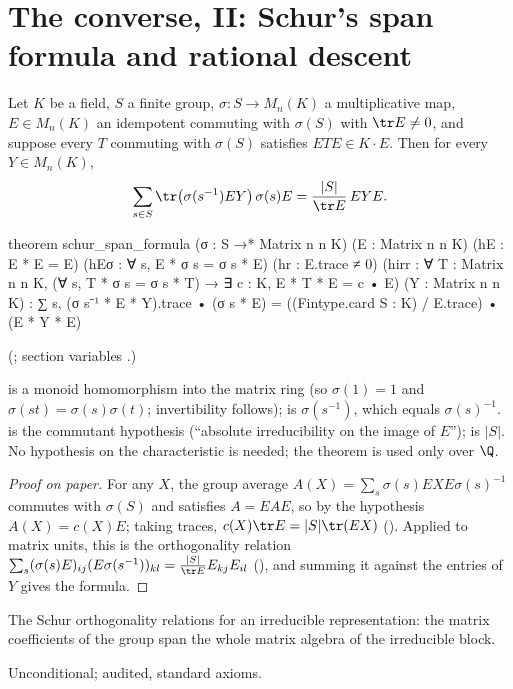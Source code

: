 \section{The converse, II: Schur's span formula and rational descent}\label{ch22:sec:schur}

\begin{theorem}\label{ch22:thm:schurspan}
Let $K$ be a field, $S$ a finite group, $\sigma:S\to M_n(K)$ a multiplicative map, $E\in M_n(K)$ an idempotent commuting with
$\sigma(S)$ with $\tr E\ne0$, and suppose every $T$ commuting with $\sigma(S)$ satisfies $ETE\in K\cdot E$.  Then for every
$Y\in M_n(K)$,
\begin{equation*}
  \sum_{s\in S}\tr\bigl(\sigma(s^{-1})EY\bigr)\,\sigma(s)E=\frac{|S|}{\tr E}\,EYE .
\end{equation*}
\end{theorem}
\begin{leancode}
theorem schur_span_formula (σ : S →* Matrix n n K) (E : Matrix n n K) (hE : E * E = E)
    (hEσ : ∀ s, E * σ s = σ s * E) (hr : E.trace ≠ 0)
    (hirr : ∀ T : Matrix n n K, (∀ s, T * σ s = σ s * T) → ∃ c : K, E * T * E = c • E)
    (Y : Matrix n n K) :
    ∑ s, (σ s⁻¹ * E * Y).trace • (σ s * E)
      = ((Fintype.card S : K) / E.trace) • (E * Y * E)
\end{leancode}
(; section variables
.)
\begin{dictionary}
 is a monoid homomorphism into the matrix ring (so $\sigma(1)=1$ and $\sigma(st)=\sigma(s)\sigma(t)$;
invertibility follows);  is $\sigma(s^{-1})$, which equals $\sigma(s)^{-1}$.   is the commutant
hypothesis (``absolute irreducibility on the image of $E$'');  is $|S|$.  No hypothesis on the characteristic is needed; the theorem is used only over $\Q$.
\end{dictionary}
\begin{proof}[Proof on paper]
For any $X$, the group average $A(X)=\sum_s\sigma(s)EXE\sigma(s)^{-1}$ commutes with $\sigma(S)$ and satisfies $A=EAE$, so
by the hypothesis $A(X)=c(X)E$; taking traces, $c(X)\tr E=|S|\tr(EX)$ ().  Applied to matrix
units, this is the orthogonality relation $\sum_s(\sigma(s)E)_{ij}(E\sigma(s^{-1}))_{kl}=\frac{|S|}{\tr E}E_{kj}E_{il}$
(), and summing it against the entries of $Y$ gives the formula.
\end{proof}
\begin{physics}The Schur orthogonality relations for an irreducible representation: the matrix coefficients of the group
span the whole matrix algebra of the irreducible block.\end{physics}
\begin{status}Unconditional; audited, standard axioms.\end{status}

